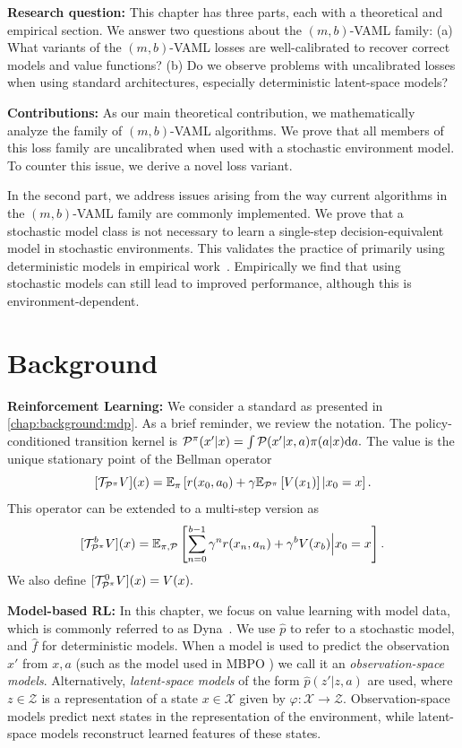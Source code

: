 \textbf{Research question:} This chapter has three parts, each with a theoretical and empirical section. We answer two questions about the $(m,b)$-VAML family: (a) What variants of the $(m,b)$-VAML losses are well-calibrated to recover correct models and value functions? (b) Do we observe problems with uncalibrated losses when using standard architectures, especially deterministic latent-space models?

\textbf{Contributions:} 
As our main theoretical contribution, we mathematically analyze the family of $(m,b)$-VAML algorithms.
We prove that all members of this loss family are uncalibrated when used with a stochastic environment model.
To counter this issue, we derive a novel loss variant.

In the second part, we address issues arising from the way current algorithms in the $(m,b)$-VAML family are commonly implemented.
We prove that a stochastic model class is not necessary to learn a single-step decision-equivalent model in stochastic environments.
This validates the practice of primarily using deterministic models in empirical work~\parencite{oh2017value,schrittwieser2020mastering,hansen2022temporal}.
Empirically we find that using stochastic models can still lead to improved performance, although this is environment-dependent.


\section{Background}

\textbf{Reinforcement Learning:} We consider a standard as presented in \autoref{chap:background:mdp}.
As a brief reminder, we review the notation.
The policy-conditioned transition kernel is $\P^\pi(x'|x) = \int \P(x'|x,a) \pi(a|x) \mathrm{d} a.$
The value is the unique stationary point of the Bellman operator $$[\mathcal{T}_{\P^\pi} V](x) = \EEX{\pi}{r(x_0,a_0) + \gamma  \EEX{\P^\pi}{V(x_1)}|x_0=x}.$$
This operator can be extended to a multi-step version as $$[{\mathcal{T}}^b_{\P^\pi} V](x) = \EEX{\pi,\P}{\sum_{n=0}^{b-1} \gamma^n r(x_n,a_n) + \gamma^b {V(x_b)}\Big|x_0=x}.$$
We also define $[\mathcal{T}_{\P^\pi}^0 V](x) = V(x).$

\textbf{Model-based RL:} In this chapter, we focus on value learning with model data, which is commonly referred to as Dyna~\parencite{dyna}.
We use $\hat{p}$ to refer to a stochastic model, and $\hat{f}$ for deterministic models.
When a model is used to predict the observation $x'$ from $x,a$ (such as the model used in MBPO \parencite{mbpo}) we call it an \emph{observation-space models}.
Alternatively, \emph{latent-space models} of the form $\hat{p}(z'|z, a)$ are used, where $z\in\mathcal{Z}$ is a representation of a state $x\in\mathcal{X}$ given by $\varphi: \mathcal{X} \rightarrow \mathcal{Z}$.
Observation-space models predict next states in the representation of the environment, while latent-space models reconstruct learned features of these states.

